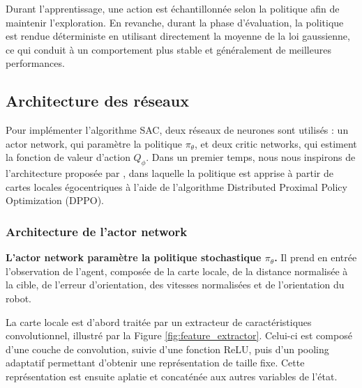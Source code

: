 \vspace{10pt}

\noindent Durant l'apprentissage, une action est échantillonnée selon la politique afin de maintenir l'exploration. En revanche, durant la phase d'évaluation, la politique est rendue déterministe en utilisant directement la moyenne de la loi gaussienne, ce qui conduit à un comportement plus stable et généralement de meilleures performances.




\subsection{Architecture des réseaux}

\noindent Pour implémenter l'algorithme SAC, deux réseaux de neurones sont utilisés : un actor network, qui paramètre la politique $\pi_\theta$, et deux critic networks, qui estiment la fonction de valeur d'action $Q_\phi$. Dans un premier temps, nous nous inspirons de l'architecture proposée par \cite{chen2020}, dans laquelle la politique est apprise à partir de cartes locales égocentriques à l'aide de l'algorithme Distributed Proximal Policy Optimization (DPPO).



\subsubsection{Architecture de l'actor network}

\noindent \textbf{L’actor network paramètre la politique stochastique $\pi_\theta$.} Il prend en entrée l’observation de l’agent, composée de la carte locale, de la distance normalisée à la cible, de l’erreur d’orientation, des vitesses normalisées et de l’orientation du robot.

\vspace{10pt}

\noindent La carte locale est d'abord traitée par un extracteur de caractéristiques convolutionnel, illustré par la Figure \ref{fig:feature_extractor}. Celui-ci est composé d'une couche de convolution, suivie d'une fonction ReLU, puis d'un pooling adaptatif permettant d'obtenir une représentation de taille fixe. Cette représentation est ensuite aplatie et concaténée aux autres variables de l'état.

